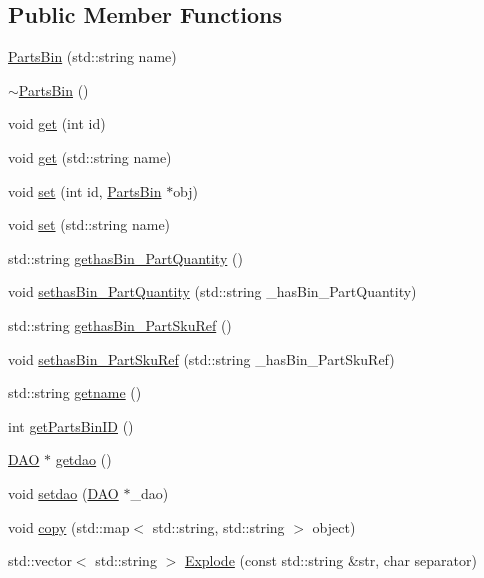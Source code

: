 \subsection*{Public Member Functions}
\begin{DoxyCompactItemize}
\item 
\hyperlink{class_parts_bin_a1e47f9c9904bbc2ededbe7850d0b35fc}{PartsBin} (std::string name)
\item 
\hyperlink{class_parts_bin_aabb860b827001c8d81b90e9b2a721808}{$\sim$PartsBin} ()
\item 
void \hyperlink{class_parts_bin_a7893bf99326f560b854aac9760718455}{get} (int id)
\item 
void \hyperlink{class_parts_bin_acc390b70050f1074a4ff25b9f4ad9ef1}{get} (std::string name)
\item 
void \hyperlink{class_parts_bin_ab3e45015cbe587fef09235e76bd7ae92}{set} (int id, \hyperlink{class_parts_bin}{PartsBin} $\ast$obj)
\item 
void \hyperlink{class_parts_bin_a31e3cbdd748787ef307978c1d1de7e06}{set} (std::string name)
\item 
std::string \hyperlink{class_parts_bin_a6688f60887e6fda8f1fc26ef2a443b21}{gethasBin\_\-PartQuantity} ()
\item 
void \hyperlink{class_parts_bin_ac5e15c635e88dc923717b1a4988619fa}{sethasBin\_\-PartQuantity} (std::string \_\-hasBin\_\-PartQuantity)
\item 
std::string \hyperlink{class_parts_bin_a41c307b0c339e65f52a826d8522f81dc}{gethasBin\_\-PartSkuRef} ()
\item 
void \hyperlink{class_parts_bin_a18109aabd707c2f2ea612bf54a608f84}{sethasBin\_\-PartSkuRef} (std::string \_\-hasBin\_\-PartSkuRef)
\item 
std::string \hyperlink{class_parts_bin_a2ff289ec33d41f80ef4d11ffca65abe5}{getname} ()
\item 
int \hyperlink{class_parts_bin_adba17e629af50c50fb00a977c2bbbad1}{getPartsBinID} ()
\item 
\hyperlink{class_d_a_o}{DAO} $\ast$ \hyperlink{class_parts_bin_a1dc5371ef5fb91fd1333d049568fb585}{getdao} ()
\item 
void \hyperlink{class_parts_bin_aee296552e16cfae974d5e6657454c471}{setdao} (\hyperlink{class_d_a_o}{DAO} $\ast$\_\-dao)
\item 
void \hyperlink{class_parts_bin_afb7e5abe1f22afeb3d23640d2a968c44}{copy} (std::map$<$ std::string, std::string $>$ object)
\item 
std::vector$<$ std::string $>$ \hyperlink{class_parts_bin_a2dd5be13c38536dc2d5f9b929fab9191}{Explode} (const std::string \&str, char separator)
\end{DoxyCompactItemize}


